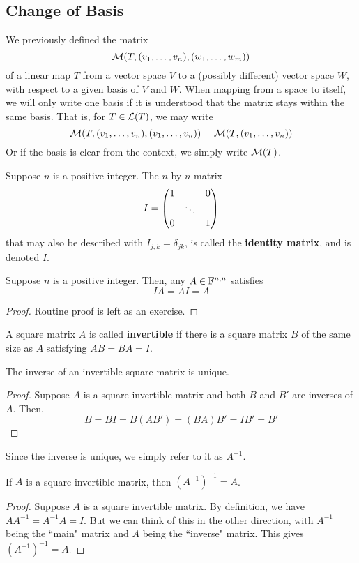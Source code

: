 \subsection*{Change of Basis}
We previously defined the matrix 
\[ \mathcal{M}(T, (v_1, \dots, v_n), (w_1, \dots, w_m)) \]
of a linear map $T$ from a vector space $V$ to a (possibly different) vector space $W$, with respect to a given basis of $V$ and $W$. When mapping from a space to itself, we will only write one basis if it is understood that the matrix stays within the same basis. That is, for $T\in\mathcal{L}(T)$, we may write
\[ \mathcal{M}(T, (v_1, \dots, v_n), (v_1, \dots, v_n)) = \mathcal{M}(T, (v_1, \dots, v_n))\]
Or if the basis is clear from the context, we simply write $\mathcal{M}(T)$.
\begin{definition}
    Suppose $n$ is a positive integer. The $n$-by-$n$ matrix
    \[ I = \begin{pmatrix}1 &  & 0 \\  & \ddots & \\ 0 & & 1\end{pmatrix}\]
    that may also be described with $I_{j,k} = \delta_{jk}$, is called the \textbf{identity matrix}, and is denoted $I$.
\end{definition}
\begin{theorem}
    Suppose $n$ is a positive integer. Then, any $A\in\mathbb F^{n,n}$ satisfies
    \[ IA = AI = A\]
\end{theorem}
\begin{proof}
    Routine proof is left as an exercise.
\end{proof}
\begin{definition}
    A square matrix $A$ is called \textbf{invertible} if there is a square matrix $B$ of the same size as $A$ satisfying $AB = BA = I$. 
\end{definition}
\begin{theorem}
    The inverse of an invertible square matrix is unique.
\end{theorem}
\begin{proof}
    Suppose $A$ is a square invertible matrix and both $B$ and $B'$ are inverses of $A$. Then,
    \[ B = BI = B(AB') = (BA)B' = IB' = B'\]
\end{proof}
Since the inverse is unique, we simply refer to it as $A^{-1}$.
\begin{theorem}
    If $A$ is a square invertible matrix, then $(A^{-1})^{-1} = A$.
\end{theorem}
\begin{proof}
    Suppose $A$ is a square invertible matrix. By definition, we have $AA^{-1} = A^{-1}A = I$. But we can think of this in the other direction, with $A^{-1}$ being the ``main" matrix and $A$ being the ``inverse" matrix. This gives $(A^{-1})^{-1} = A$.
\end{proof}
